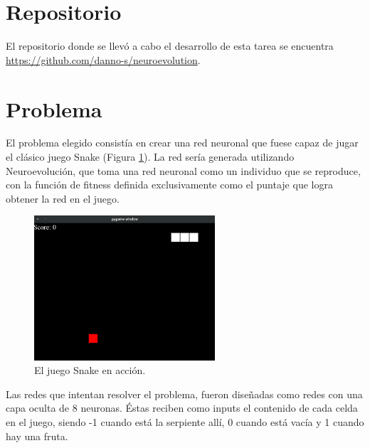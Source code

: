 \documentclass[letterpaper,11pt]{article} %
\begin{document}








\section*{Repositorio}
  El repositorio donde se llevó a cabo el desarrollo de esta tarea se encuentra \href{aquí}{https://github.com/danno-s/neuroevolution}.

\section{Problema}
  El problema elegido consistía en crear una red neuronal que fuese capaz de jugar el clásico juego Snake (Figura \ref{snakegame}). La red sería generada utilizando Neuroevolución, que toma una red neuronal como un individuo que se reproduce, con la función de fitness definida exclusivamente como el puntaje que logra obtener la red en el juego.

  \begin{figure}
    \centering
    \includegraphics[width=0.6\textwidth]{images/snake.png}
    \caption{El juego Snake en acción.}
    \label{snakegame}
  \end{figure}

  Las redes que intentan resolver el problema, fueron diseñadas como redes con una capa oculta de 8 neuronas. Éstas reciben como inputs el contenido de cada celda en el juego, siendo -1 cuando está la serpiente allí, 0 cuando está vacía y 1 cuando hay una fruta.
\end{document}
